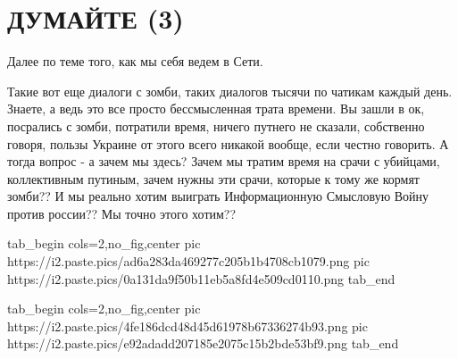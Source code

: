  
 
 
 
 

\section{ДУМАЙТЕ (3)}

Далее по теме того, как мы себя ведем в Сети.

Такие вот еще диалоги с зомби, таких диалогов тысячи по чатикам каждый день.
Знаете, а ведь это все просто бессмысленная трата времени. Вы зашли в ок,
посрались с зомби, потратили время, ничего путнего не сказали, собственно
говоря, пользы Украине от этого всего никакой вообще, если честно говорить. А
тогда вопрос - а зачем мы здесь? Зачем мы тратим время на срачи с убийцами,
коллективным путиным, зачем нужны эти срачи, которые к тому же кормят зомби?? И
мы реально хотим выиграть Информационную Смысловую Войну против россии?? Мы
точно этого хотим??

\ifcmt
  tab_begin cols=2,no_fig,center
     pic https://i2.paste.pics/ad6a283da469277c205b1b4708cb1079.png
		 pic https://i2.paste.pics/0a131da9f50b11eb5a8fd4e509cd0110.png
  tab_end
\fi

\ifcmt
  tab_begin cols=2,no_fig,center
     pic https://i2.paste.pics/4fe186dcd48d45d61978b67336274b93.png
		 pic https://i2.paste.pics/e92adadd207185e2075c15b2bde53bf9.png
  tab_end
\fi
